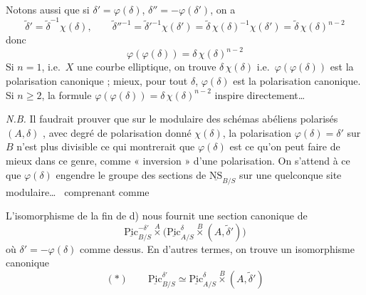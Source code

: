 \documentclass[11pt,a4paper]{article}
\begin{document}
Notons aussi que si $\delta' = \varphi(\delta)$, $\delta'' = -\varphi(\delta')$, on a
\[
\tilde{\delta}' = \tilde{\delta}^{-1} \chi(\delta) ,
\qquad
\tilde{\delta}''^{-1} = \tilde{\delta}'^{-1} \chi(\delta')
= \tilde{\delta}\, \chi(\delta)^{-1} \chi(\delta') = \tilde{\delta}\, \chi(\delta)^{n-2}
\]
donc
\[
\varphi(\varphi(\delta)) = \delta\, \chi(\delta)^{n-2}
\]
Si \struck{\ill{}} $n = 1$, i.e.\ $X$ une courbe elliptique, on
 trouve $\delta\,\chi(\delta)$
i.e.\ $\varphi(\varphi(\delta))$ est la polarisation canonique ;
\struck{[N.B.\ $\varphi($} mieux, pour tout $\delta$, $\varphi(\delta)$ est la
polarisation canonique. Si $n \geq 2$, la formule
$\varphi(\varphi(\delta)) = \delta\,\chi(\delta)^{n-2}$ inspire 
directement\ldots

\emph{N.B.} Il faudrait prouver que sur le  \struck{\ill{}}
 modulaire des schémas abéliens polarisés $(A, \delta)$
, avec degré de polarisation donné $\chi(\delta)$,
la polarisation $\varphi(\delta) = \delta'$ \struck{\ill{}} sur $B$ n'est plus
divisible  \ill{} ce qui montrerait que $\varphi(\delta)$
est ce qu'on peut faire de mieux dans ce genre, comme  « inversion » d'une polarisation.  On s'attend à ce que
$\varphi(\delta)$ engendre le groupe  des sections de
$\underline{\mathrm{NS}}_{B/S}$ sur une quelconque \struck{\ill{}} site
modulaire\ldots\ \struck{\ill{}} \ill{} comprenant comme \ill{} 


L'isomorphisme de la fin de d) nous fournit une section canonique de
\[
\underline{\mathrm{Pic}}^{-\delta'}_{B/S} \overset{A}{\times}
\bigl(\underline{\mathrm{Pic}}^{\delta}_{A/S} \overset{B}{\times} (A, \tilde{\delta}')\bigr)
\]
où $\delta' = -\varphi(\delta)$ comme dessus. En d'autres termes, on trouve un
isomorphisme canonique
\[
(*) \qquad
\boxed{\underline{\mathrm{Pic}}^{\delta'}_{B/S} \simeq
\underline{\mathrm{Pic}}^{\delta}_{A/S} \overset{B}{\times} (A, \tilde{\delta}')}
\]
\end{document}
